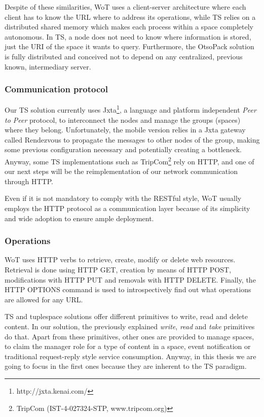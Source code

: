 Despite of these similarities, WoT uses a client-server architecture where each client has to know the URL where to address its operations, while
TS relies on a distributed shared memory which makes each process within a space completely autonomous. In TS, a node does not need to know where
information is stored, just the URI of the space it wants to query. Furthermore, the OtsoPack solution is fully distributed and conceived not to depend
on any centralized, previous known, intermediary server.

\subsubsection{Communication protocol}
Our TS solution currently uses Jxta\footnote{http://jxta.kenai.com/}, a language and platform independent \textit{Peer to Peer} protocol, to
interconnect the nodes and manage the groups (spaces) where they belong. Unfortunately, the mobile version relies in a Jxta gateway called Rendezvous
to propagate the messages to other nodes of the group, making some previous configuration necessary and potentially creating a bottleneck. Anyway,
some TS implementations such as TripCom\footnote{TripCom (IST-4-027324-STP, www.tripcom.org)} rely on HTTP, and one of our next steps will be the
reimplementation of our network communication through HTTP.

Even if it is not mandatory to comply with the RESTful style, WoT usually employs the HTTP protocol as a communication layer because of its
simplicity and wide adoption to ensure ample deployment.

\subsubsection{Operations}
WoT uses HTTP verbs to retrieve, create, modify or delete web resources. Retrieval is done using HTTP GET, creation by means of HTTP POST,
modifications with HTTP PUT and removals with HTTP DELETE. Finally, the HTTP OPTIONS command is used to introspectively find out what operations are
allowed for any URL.

TS and tuplespace solutions offer different primitives to write, read and delete content. In our solution, the previously explained \textit{write},
\textit{read} and \textit{take} primitives do that. Apart from these primitives, other ones are provided to manage spaces, to claim the manager role
for a type of content in a space, event notification or traditional request-reply style service consumption. Anyway, in this thesis we are going to focus in the
first ones because they are inherent to the TS paradigm. %

